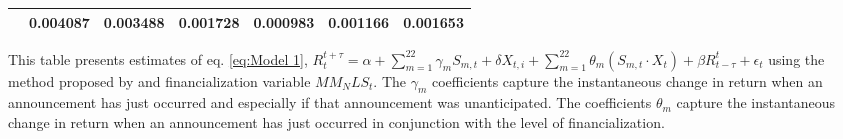 \begin{sidewaystable}
{\begin{tabular}{@{}lllllllllllll@{}}
&\multicolumn{2}{c}{ 0.004087 }                                                 & \multicolumn{2}{c}{ 0.003488 }                                                 & \multicolumn{2}{c}{ 0.001728 }                                                 & \multicolumn{2}{c}{ 0.000983 }                                                 & \multicolumn{2}{c}{ 0.001166 }                                                   & \multicolumn{2}{c}{ 0.001653 }                                                 \\ \bottomrule 
\end{tabular}
}
\begin{tablenotes}\item 
    \singlespacing
    \footnotesize
    This table presents estimates of eq. \ref{eq:Model 1}, $R_{t}^{t+\tau}=\alpha+\sum_{m=1}^{22} \gamma_m S_{m,t}+ \delta X_{t,i} + \sum_{m=1}^{22} \theta_m (S_{m,t} \cdot X_t)+\beta R_{t-\tau}^{t}+\epsilon_{t}$ using the method proposed by \citet{kurov2019price} and financialization variable $MM_NLS_t$. The $\gamma_m$ coefficients capture the instantaneous change in return when an announcement has just occurred and especially if that announcement was unanticipated. The coefficients $\theta_m$ capture the instantaneous change in return when an announcement has just occurred in conjunction with the level of financialization.
\end{tablenotes}
\end{sidewaystable}


